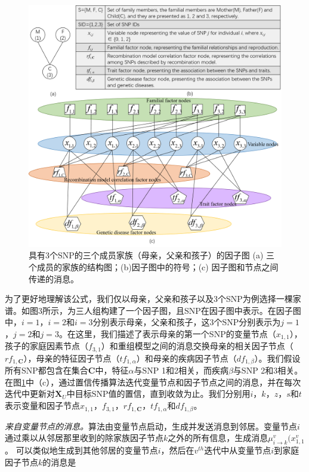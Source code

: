 \begin{figure}[htbp]
	\centering
	\includegraphics[width=0.95\linewidth]{./figures/factor-graph.png}
	\centering
	\caption{具有3个SNP的三个成员家族（母亲，父亲和孩子）的因子图 (a) 三个成员的家族的结构图；(b)因子图中的符号；(c) 因子图和节点之间传递的消息。}\label{fig:factor-graph}
\end{figure}

为了更好地理解该公式，我们仅以母亲，父亲和孩子以及3个SNP为例选择一棵家谱。如图3所示，为三人组构建了一个因子图，且SNP在因子图中表示。在因子图中，$i=1$，$i=2$和$i=3$分别表示母亲，父亲和孩子，这3个SNP分别表示为$j=1$，$j=2$和$j=3$。在这里，我们描述了表示母亲的第一个SNP的变量节点（$x_{1,1}$），孩子的家庭因素节点（$f_{3,1}$）和重组模型之间的消息交换母亲的相关因子节点（$rf_{1,\mathbf{C}}$），母亲的特征因子节点（$tf_{1,\alpha}$）和母亲的疾病因子节点（$df_{1,\beta}$）。我们假设所有SNP都包含在集合$\mathbf{C}$中，特征$\alpha$与SNP 1和2相关，而疾病$\beta$与SNP 2和3相关。在图\ref{fig:factor-graph}中（c），通过置信传播算法迭代变量节点和因子节点之间的消息，并在每次迭代中更新对$\mathbf{X}_U$中目标SNP值的置信，直到收敛为止。我们分别用$i$，$k$，$z$，$s$和$t$表示变量和因子节点$x_{1,1}$，$f_{3,1}$，$rf_{1,\mathbf{C}}$，$tf_{1,\alpha}$和$df_{1,\beta}$。


\emph{来自变量节点的消息。}算法由变量节点启动，生成并发送消息到邻居。变量节点$i$通过乘以从邻居那里收到的除家族因子节点$k$之外的所有信息，生成消息$\mu_{i \rightarrow k}^v(x_{1,1}^v$。 可以类似地生成到其他邻居的变量节点$i$，然后在$v^{th}$迭代中从变量节点$i$到家庭因子节点$k$的消息是

